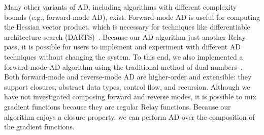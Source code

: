 Many other variants of AD, including algorithms with different
  complexity bounds (e.g., forward-mode AD), exist.
Forward-mode AD is useful for computing the
  Hessian vector product, which is necessary for techniques like differentiable architecture search
  (DARTS)~\citep{darts}.
Because our AD algorithm just another Relay pass,
  it is possible for users to implement and experiment with different
  AD techniques without changing the system.
To this end, we also implemented a  forward-mode AD algorithm using the traditional method of dual
  numbers~\citep{ad_survey}.
Both forward-mode and reverse-mode AD are higher-order and extensible: they
  support closures, abstract data types, control flow, and recursion.
Although we have not investigated
  composing forward and reverse modes,
  it is possible to mix gradient functions
  because they are regular Relay functions.
Because our algorithm enjoys a closure property,
  we can perform AD over the composition of the gradient
  functions.

